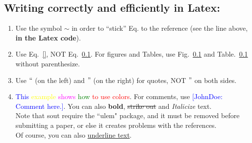 \documentclass[pre,aps,reprint,noshowpacs,superscriptaddress,floatfix,letterpaper,longbibliography]{revtex4-2}
\newcommand{\Comment}[1]{\textcolor{blue}{[JohnDoe: #1]}}
\newcommand{\red}{\textcolor{red}}
\newcommand{\green}{\textcolor{green}}
\newcommand{\blue}{\textcolor{blue}}
\newcommand{\yellow}{\textcolor{yellow}}
\newcommand{\magenta}{\textcolor{magenta}}
\begin{document}
\subsection{Writing correctly and efficiently in Latex:}
\begin{enumerate} 
\item Use the symbol $\sim$ in order to ``stick'' Eq. to the reference (see the line above, \textbf{in the Latex code}). 

\item Use Eq.~\eqref{}, NOT Eq.~\ref{}. For figures and Tables, use Fig.~\ref{} and Table.~\ref{} without parenthesize. 

    \item Use $``$ (on the left) and $"$ (on the right) for quotes, NOT $"$ on both sides. 
    
\item \blue{This} \yellow{example} \magenta{shows} \green{how} \red{to use colors}. For comments, use \Comment{Comment here.}. You can also \textbf{bold}, \sout{strike out} and \textit{Italicize} text. \\ Note that sout require the ``ulem" package, and it must be removed before submitting a paper, or else it creates problems with the references.\\ Of course, you can also \underline{underline text}. 


\end{enumerate}
\end{document}
